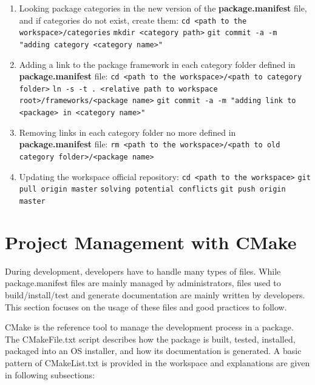 \documentclass[12pt,a4paper]{article}
\begin{document}
\begin{enumerate}
\item Looking package categories in the new version of the \textbf{package.manifest} file, and if categories do not exist, create them:
\linebreak \verb|cd <path to the workspace>/categories|
\linebreak \verb|mkdir <category path>|
\linebreak \verb|git commit -a -m "adding category <category name>"|
\item Adding a link to the package framework in each category folder defined in \textbf{package.manifest} file:
\linebreak \verb|cd <path to the workspace>/<path to category folder>|
\linebreak \verb|ln -s -t . <relative path to workspace root>/frameworks/<package name>|
\linebreak \verb|git commit -a -m "adding link to <package> in <category name>"|
\item Removing links in each category folder no more defined in \textbf{package.manifest} file:
\linebreak \verb|rm <path to the workspace>/<path to old category folder>/<package name>|
\item Updating the workspace official repository:
\linebreak \verb|cd <path to the workspace>|
\linebreak \verb|git pull origin master|
\linebreak \verb|solving potential conflicts|
\linebreak \verb|git push origin master|
\end{enumerate}

\pagebreak
\section{Project Management with CMake}

During development, developers have to handle many types of files. While package.manifest files are mainly managed by administrators, files used to build/install/test and generate documentation are mainly written by developers. This section focuses on the usage of these files and good practices to follow.

CMake is the reference tool to manage the development process in a package. The CMakeFile.txt script describes how the package is built, tested, installed, packaged into an OS installer, and how its documentation is generated. A basic pattern of CMakeList.txt is provided in the workspace and explanations are given in following subsections:
\end{document}
